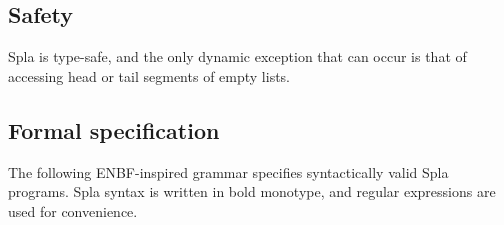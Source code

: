 \documentclass[english,10pt]{article} %
\theoremstyle{definitionstyle}
\theoremstyle{lemmastyle}
\begin{document}
\subsection{Safety}

Spla is type-safe, and the only dynamic exception that can occur is that of accessing head or tail segments of empty lists.


\subsection{Formal specification}

The following ENBF-inspired grammar specifies syntactically valid Spla programs. Spla syntax is written in bold monotype, and regular expressions are used for convenience.

\end{document}
